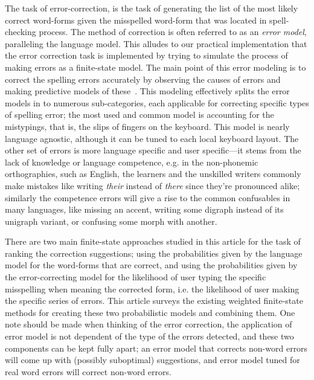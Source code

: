 \documentclass[a4paper,12pt]{article}
\begin{document}
The task of error-correction, is the task of generating the list of the most
likely correct word-forms given the misspelled word-form that was located in
spell-checking process. The method of correction is often referred to as an
\emph{error model}, paralleling the language model. This alludes to our
practical implementation that the error correction task is implemented by
trying to simulate the process of making errors as a finite-state model. The
main point of this error modeling is to correct the spelling errors accurately
by observing the causes of errors and making predictive models of
these~\cite[]{deorowicz2005correcting}.  This modeling effectively splits the
error models in to numerous sub-categories, each applicable for correcting
specific types of spelling error; the most used and common model is accounting
for the mistypings, that is, the slips of fingers on the keyboard. This model
is nearly language agnostic, although it can be tuned to each local keyboard
layout. The other set of errors is more language specific and user
specific---it stems from the lack of knowledge or language competence, e.g.  in
the non-phonemic orthographies, such as English, the learners and the unskilled
writers commonly make mistakes like writing \emph{their} instead of
\emph{there} since they're pronounced alike; similarly the competence errors
will give a rise to the common confusables in many languages, like missing an
accent, writing some digraph instead of its unigraph variant, or confusing some
morph with another.

There are two main finite-state approaches studied in this article for the task
of ranking the correction suggestions; using the probabilities given by the
language model for the word-forms that are correct, and using the probabilities
given by the error-correcting model for the likelihood of user typing the
specific misspelling when meaning the corrected form, i.e. the likelihood of
user making the specific series of errors. This article surveys the existing
weighted finite-state methods for creating these two probabilistic models and
combining them. One note should be made when thinking of the error correction,
the application of error model is not dependent of the type of the errors
detected, and these two components can be kept fully apart; an error model that
corrects non-word errors will come up with (possibly suboptimal) suggestions,
and error model tuned for real word errors will correct non-word errors.  
\end{document}
